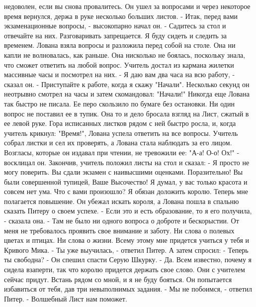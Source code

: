 недоволен, если вы снова провалитесь.
    Он ушел за вопросами и через некоторое время вернулся, держа в 
руке несколько больших листов.
    - Итак, перед вами экзаменационные вопросы, - высокопарно начал 
он. - Садитесь за стол и отвечайте на них. Разговаривать запрещается. 
Я буду сидеть и следить за временем.
    Лована взяла вопросы и разложила перед собой на столе. Она ни 
капли не волновалась, как раньше. Она нисколько не боялась, поскольку 
знала, что сможет ответить на любой вопрос.
    Учитель достал из кармана жилетки массивные часы и посмотрел на 
них.
    - Я даю вам два часа на всю работу, - сказал он. - Приступайте к 
работе, когда я скажу "Начали".
    Несколько секунд он неотрывно смотрел на часы и затем скомандовал: 
"Начали!"
    Никогда еще Лована так быстро не писала. Ее перо скользило по 
бумаге без остановки. Ни один вопрос не поставил ее в тупик. Она то и 
дело бросала взгляд на Лист, сжатый в ее левой руке. Гора исписанных 
листков рядом с ней быстро росла, и, когда учитель крикнул: "Время!", 
Лована успела ответить на все вопросы.
    Учитель собрал листки и сел их проверять, а Лована стала наблюдать 
за его лицом. Возгласы, которые он издавал при чтении, не тревожили 
ее: "А-а! О-о! Ох!" - восклицал он.
    Закончив, учитель положил листы на стол и сказал:
    - Я просто не могу поверить. Вы сдали экзамен с наивысшими 
оценками. Поразительно! Вы были совершенной тупицей, Ваше Высочество! 
Я думал, у вас только красота и совсем нет ума. Что с вами произошло? 
Я обязан доложить королю. Теперь мне полагается повышение.
    Он убежал искать короля, а Лована пошла в спальню сказать Питеру о 
своем успехе.
    - Если это и есть образование, то я его получила, - сказала она. - 
Там не было ни одного вопроса о доброте и бескорыстии. От меня не 
требовалось проявить свое внимание и заботу. Ни слова о полевых цветах 
и птицах. Ни слова о жизни. Всему этому мне придется учиться у тебя и 
Кривого Мика.
    - Ты уже выучилась, - ответил Питер. А затем спросил: - Теперь ты 
свободна? - Он спешил спасти Серую Шкурку.
    - Да. Всем известно, почему я сидела взаперти, так что королю 
придется держать свое слово. Они с учителем сейчас придут. Встань 
рядом со мной, и я не буду бояться. Он попытается избавиться от тебя, 
дав три невыполнимых задания.
    - Мы не побоимся, - ответил Питер. - Волшебный Лист нам поможет.
